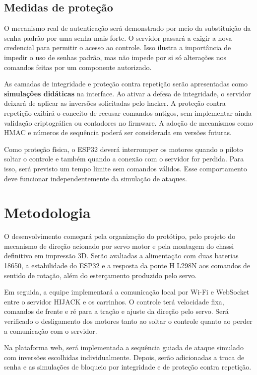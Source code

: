 \documentclass[12pt,a4paper]{article}
\begin{document}
\subsection{Medidas de proteção}
O mecanismo real de autenticação será demonstrado por meio da substituição
da senha padrão por uma senha mais forte. O servidor passará a exigir a
nova credencial para permitir o acesso ao controle. Isso ilustra a
importância de impedir o uso de senhas padrão, mas não impede por si só
alterações nos comandos feitas por um componente autorizado.

As camadas de integridade e proteção contra repetição serão apresentadas
como \textbf{simulações didáticas} na interface. Ao ativar a defesa de
integridade, o servidor deixará de aplicar as inversões solicitadas pelo
hacker. A proteção contra repetição exibirá o conceito de recusar comandos
antigos, sem implementar ainda validação criptográfica ou contadores no
firmware. A adoção de mecanismos como HMAC e números de sequência poderá
ser considerada em versões futuras.

Como proteção física, o ESP32 deverá interromper os motores quando o
piloto soltar o controle e também quando a conexão com o servidor for
perdida. Para isso, será previsto um tempo limite sem comandos válidos.
Esse comportamento deve funcionar independentemente da simulação de ataques.

\section{Metodologia}
O desenvolvimento começará pela organização do protótipo, pelo projeto
do mecanismo de direção acionado por servo motor e pela montagem
do chassi definitivo em impressão 3D. Serão avaliadas a alimentação com
duas baterias 18650, a estabilidade do ESP32 e a resposta da ponte H L298N
aos comandos de sentido de rotação, além do esterçamento produzido pelo servo.

Em seguida, a equipe implementará a comunicação local por Wi-Fi e
WebSocket entre o servidor HIJACK e os carrinhos. O controle terá velocidade
fixa, comandos de frente e ré para a tração e ajuste da direção pelo servo. Será verificado
o desligamento dos motores tanto ao soltar o controle quanto ao perder
a comunicação com o servidor.

Na plataforma web, será implementada a sequência guiada de ataque simulado
com inversões escolhidas individualmente. Depois, serão adicionadas a
troca de senha e as simulações de bloqueio por integridade e de proteção
contra repetição.
\end{document}
